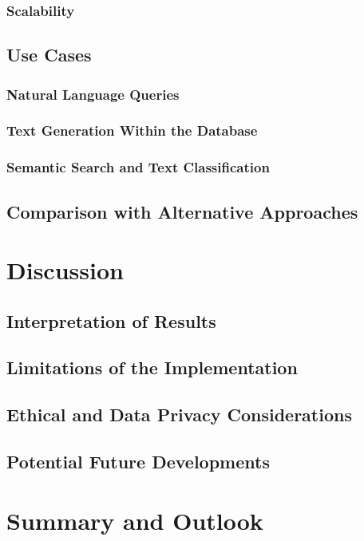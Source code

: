 \documentclass{article}
\begin{document}
\subsubsection{Scalability}

\subsection{Use Cases}
\subsubsection{Natural Language Queries}
\subsubsection{Text Generation Within the Database}
\subsubsection{Semantic Search and Text Classification}

\subsection{Comparison with Alternative Approaches}

\newpage

\section{Discussion}

\subsection{Interpretation of Results}
\subsection{Limitations of the Implementation}
\subsection{Ethical and Data Privacy Considerations}
\subsection{Potential Future Developments}

\newpage

\section{Summary and Outlook}
\end{document}
